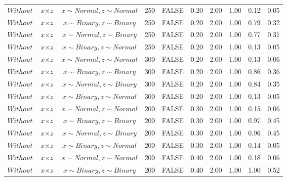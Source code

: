 \begin{longtable}{lccccccccc}
  $Without$ & $\textit{x} \times \textit{z}$ & $\textit{x} \sim Normal , \textit{z} \sim Normal$ & 250 & FALSE & 0.20 & 2.00 & 1.00 & 0.12 & 0.05 \\ 
  $Without$ & $\textit{x} \times \textit{z}$ & $\textit{x} \sim Binary, \textit{z} \sim Binary$ & 250 & FALSE & 0.20 & 2.00 & 1.00 & 0.79 & 0.32 \\ 
  $Without$ & $\textit{x} \times \textit{z}$ & $\textit{x} \sim Normal, \textit{z} \sim Binary$ & 250 & FALSE & 0.20 & 2.00 & 1.00 & 0.77 & 0.31 \\ 
  $Without$ & $\textit{x} \times \textit{z}$ & $\textit{x} \sim Binary, \textit{z} \sim Normal$ & 250 & FALSE & 0.20 & 2.00 & 1.00 & 0.13 & 0.05 \\ 
  $Without$ & $\textit{x} \times \textit{z}$ & $\textit{x} \sim Normal , \textit{z} \sim Normal$ & 300 & FALSE & 0.20 & 2.00 & 1.00 & 0.13 & 0.06 \\ 
  $Without$ & $\textit{x} \times \textit{z}$ & $\textit{x} \sim Binary, \textit{z} \sim Binary$ & 300 & FALSE & 0.20 & 2.00 & 1.00 & 0.86 & 0.36 \\ 
  $Without$ & $\textit{x} \times \textit{z}$ & $\textit{x} \sim Normal, \textit{z} \sim Binary$ & 300 & FALSE & 0.20 & 2.00 & 1.00 & 0.84 & 0.35 \\ 
  $Without$ & $\textit{x} \times \textit{z}$ & $\textit{x} \sim Binary, \textit{z} \sim Normal$ & 300 & FALSE & 0.20 & 2.00 & 1.00 & 0.13 & 0.05 \\ 
  $Without$ & $\textit{x} \times \textit{z}$ & $\textit{x} \sim Normal , \textit{z} \sim Normal$ & 200 & FALSE & 0.30 & 2.00 & 1.00 & 0.15 & 0.06 \\ 
  $Without$ & $\textit{x} \times \textit{z}$ & $\textit{x} \sim Binary, \textit{z} \sim Binary$ & 200 & FALSE & 0.30 & 2.00 & 1.00 & 0.97 & 0.45 \\ 
  $Without$ & $\textit{x} \times \textit{z}$ & $\textit{x} \sim Normal, \textit{z} \sim Binary$ & 200 & FALSE & 0.30 & 2.00 & 1.00 & 0.96 & 0.45 \\ 
  $Without$ & $\textit{x} \times \textit{z}$ & $\textit{x} \sim Binary, \textit{z} \sim Normal$ & 200 & FALSE & 0.30 & 2.00 & 1.00 & 0.14 & 0.05 \\ 
  $Without$ & $\textit{x} \times \textit{z}$ & $\textit{x} \sim Normal , \textit{z} \sim Normal$ & 200 & FALSE & 0.40 & 2.00 & 1.00 & 0.18 & 0.06 \\ 
  $Without$ & $\textit{x} \times \textit{z}$ & $\textit{x} \sim Binary, \textit{z} \sim Binary$ & 200 & FALSE & 0.40 & 2.00 & 1.00 & 1.00 & 0.52 \\ 

\end{longtable}
